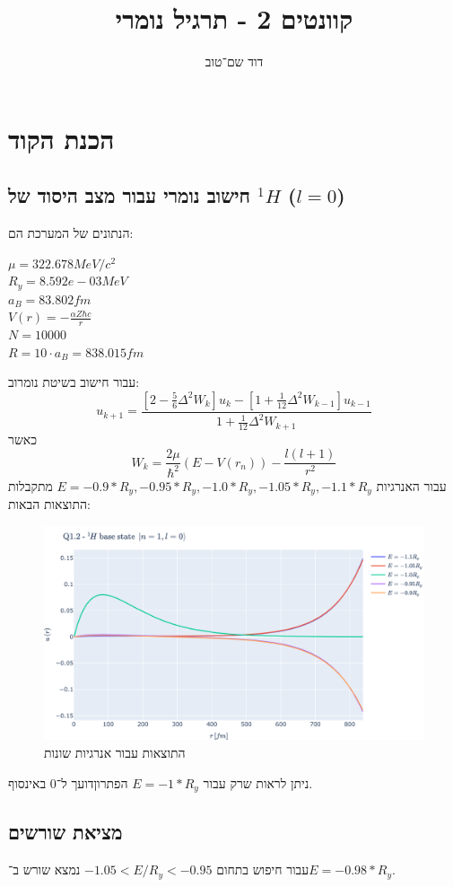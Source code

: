 \documentclass{article}
\title{קוונטים 2 - תרגיל נומרי}
\author{דוד שם־טוב}
\begin{document}
\maketitle

\section{הכנת הקוד}
\subsection{חישוב נומרי עבור מצב היסוד של ${}^{1}\!H$ ($l=0$)}
הנתונים של המערכת הם:
\begin{multicols}{3}
    $\mu = 322.678 MeV / c^2$ \\
    $R_y = 8.592e-03 MeV$ \\
    $a_B = 83.802 fm$ \\
    $V(r) = -\frac{\alpha Z \hbar c}{r}$ \\
    $N = 10000$ \\
    $R = 10\cdot a_B = 838.015 fm$
\end{multicols}
עבור חישוב בשיטת נומרוב:
$$u_{k+1} = \frac{\left[2-\frac{5}{6}\Delta^2W_k\right]u_k-\left[1+\frac{1}{12}\Delta^2W_{k-1}\right]u_{k-1}}{1+\frac{1}{12}\Delta^2W_{k+1}}$$
כאשר 
$$W_k = \frac{2\mu}{\hbar^2}\left(E-V\left(r_n\right)\right) - \frac{l(l+1)}{r^2}$$
עבור האנרגיות $ E = -0.9 * R_y, -0.95 * R_y, -1.0 * R_y, -1.05 * R_y, -1.1 * R_y$ מתקבלות התוצאות הבאות:

\begin{figure}[h]\label{fig:1.2}
    \centering
    \includegraphics[width=\linewidth]{plots/1.2.pdf}
    \caption{התוצאות עבור אנרגיות שונות} %
\end{figure}
ניתן לראות שרק עבור $E = -1 * R_y$ הפתרוןדועך ל־0 באינסוף.

\subsection{מציאת שורשים}
עבור חיפוש בתחום $-1.05 < E/R_y < -0.95$ נמצא שורש ב־$E = -0.98 * R_y$.
\end{document}
